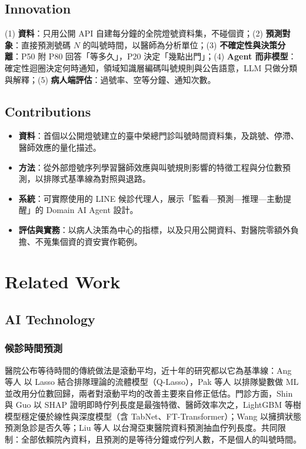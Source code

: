 \documentclass[11pt,twocolumn]{article}
\begin{document}
\subsection{Innovation}
(1) \textbf{資料}：只用公開 API 自建每分鐘的全院燈號資料集，不碰個資；(2) \textbf{預測對象}：直接預測號碼 $N$ 的叫號時間，以醫師為分析單位；(3) \textbf{不確定性與決策分離}：P50 附 P80 回答「等多久」，P20 決定「幾點出門」；(4) \textbf{Agent 而非模型}：確定性迴圈決定何時通知，領域知識層編碼叫號規則與公告語意，LLM 只做分類與解釋；(5) \textbf{病人端評估}：過號率、空等分鐘、通知次數。

\subsection{Contributions}
\begin{itemize}
\item \textbf{資料}：首個以公開燈號建立的臺中榮總門診叫號時間資料集，及跳號、停滯、醫師效應的量化描述。
\item \textbf{方法}：從外部燈號序列學習醫師效應與叫號規則影響的特徵工程與分位數預測，以排隊式基準線為對照與退路。
\item \textbf{系統}：可實際使用的 LINE 候診代理人，展示「監看—預測—推理—主動提醒」的 Domain AI Agent 設計。
\item \textbf{評估與實務}：以病人決策為中心的指標，以及只用公開資料、對醫院零額外負擔、不蒐集個資的資安實作範例。
\end{itemize}

\section{Related Work}

\subsection{AI Technology}
\subsubsection{候診時間預測}
醫院公布等待時間的傳統做法是滾動平均，近十年的研究都以它為基準線：Ang 等人 \cite{ang2016} 以 Lasso 結合排隊理論的流體模型（Q-Lasso），Pak 等人 \cite{pak2021} 以排隊變數做 ML 並改用分位數回歸，兩者對滾動平均的改善主要來自修正低估。門診方面，Shin \cite{shin2024} 與 Guo \cite{guo2025} 以 SHAP 證明即時佇列長度是最強特徵、醫師效率次之，LightGBM 等樹模型穩定優於線性與深度模型（含 TabNet、FT-Transformer）；Wang \cite{wang2025} 以擁擠狀態預測急診是否久等；Liu 等人 \cite{liu2026} 以台灣亞東醫院資料預測抽血佇列長度。共同限制：全部依賴院內資料，且預測的是等待分鐘或佇列人數，不是個人的叫號時間。
\end{document}
